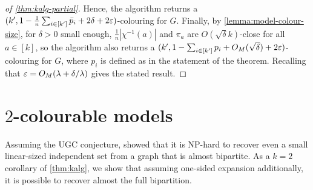 \begin{proof}[of \cref{thm:kalg-partial}]
    Hence, the algorithm returns a $(k', 1 - \frac{1}{n} \sum_{i \in [k']} \bar{p}_i + 2\delta + 2\varepsilon)$-colouring for $G$.
    Finally, by \cref{lemma:model-colour-size}, for $\delta > 0$ small enough, $\frac{1}{n} |\chi^{-1}(a)|$ and $\pi_a$ are $O(\sqrt{\delta}k)$-close for all $a \in [k]$, so the algorithm also returns a $(k', 1 - \sum_{i \in [k']} p_i + O_M(\sqrt{\delta}) + 2\varepsilon)$-colouring for $G$, where $p_i$ is defined as in the statement of the theorem.
    Recalling that $\varepsilon = O_M(\lambda + \delta/\lambda)$ gives the stated result.
\end{proof}



\section{$2$-colourable models}


Assuming the UGC conjecture, \cite{MR2648426} showed that it is NP-hard to recover even a small linear-sized independent set from a graph that is almost bipartite. As a $k=2$ corollary of \cref{thm:kalg}, we show that assuming one-sided expansion additionally, it is possible to recover almost the full bipartition.


